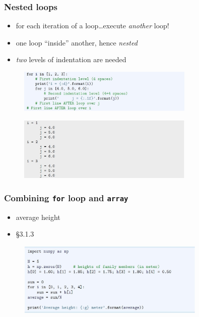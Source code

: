 \documentclass[english,14pt]{beamer}
\newcommand\red[1]{{\color{red} #1}}
\begin{document}
\begin{frame}[fragile]

\frametitle{Nested loops}

\vspace*{-3mm}
\begin{itemize}
	\item for each iteration of a loop\ldots execute \emph{another} loop!
	\item one loop ``inside'' another, hence \red{\emph{nested}}
	\item \emph{two} levels of indentation are needed
\end{itemize}
	
\begin{figure}[ht]
	\centering
	\includegraphics[width=0.75\textwidth]{figures/LLp61a}
\end{figure}
\vspace*{-3mm}
\begin{figure}[ht]
	\centering
	\includegraphics[width=0.75\textwidth]{figures/LLp61b}
\end{figure}

\end{frame}


\begin{frame}[fragile]

\frametitle{Combining \texttt{for} loop and \texttt{array}}

\begin{itemize}
	\item average height
	\item \S3.1.3
\end{itemize}

\begin{figure}[ht]
	\centering
	\includegraphics[width=0.8\textwidth]{figures/LLp62a}
\end{figure}

\end{frame}
\end{document}
